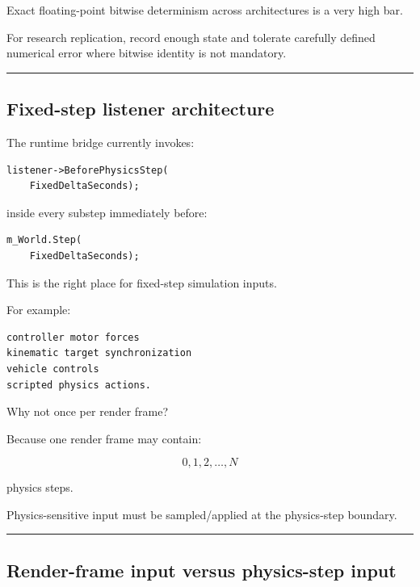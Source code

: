 Exact floating-point bitwise determinism across architectures is a very high bar.

For research replication, record enough state and tolerate carefully defined numerical error where bitwise identity is not mandatory.

\begin{center}\rule{0.5\linewidth}{0.5pt}\end{center}

\subsection{Fixed-step listener architecture}\label{06-engine-ii-ch037-fixed-step-listener-architecture}

\hypertarget{06-engine-ii-ch037-fixed-step-listener-architecture}{}

The runtime bridge currently invokes:

\begin{verbatim}
listener->BeforePhysicsStep(
    FixedDeltaSeconds);
\end{verbatim}

inside every substep immediately before:

\begin{verbatim}
m_World.Step(
    FixedDeltaSeconds);
\end{verbatim}

This is the right place for fixed-step simulation inputs.

For example:

\begin{verbatim}
controller motor forces
kinematic target synchronization
vehicle controls
scripted physics actions.
\end{verbatim}

Why not once per render frame?

Because one render frame may contain:

\[
0,1,2,\dots,N
\]

physics steps.

Physics-sensitive input must be sampled/applied at the physics-step boundary.

\begin{center}\rule{0.5\linewidth}{0.5pt}\end{center}

\subsection{Render-frame input versus physics-step input}\label{06-engine-ii-ch037-render-frame-input-versus-physics-step-input}

